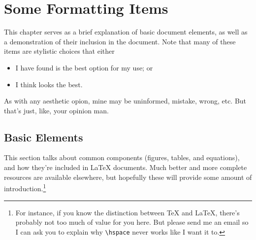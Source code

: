 \chapter{Some Formatting Items}

This chapter serves as a brief explanation of basic document elements, as well as a demonstration of their inclusion in the document.
Note that many of these items are stylistic choices that either
\begin{itemize}
  \item I have found is the best option for my use; or
  \item I think looks the best.
\end{itemize}
As with any aesthetic opion, mine may be uninformed, mistake, wrong, etc. 
But that's just, like, your opinion man.

\section{Basic Elements}
This section talks about common components (figures, tables, and equations), and how they're included in \LaTeX{} documents.
Much better and more complete resources are available elsewhere, but hopefully these will provide some amount of introduction.\footnote{%
For instance, if you know the distinction between \TeX{} and \LaTeX{}, there's probably not too much of value for you here. 
But please send me an email so I can ask you to explain why \texttt{\textbackslash hspace} never works like I want it to.
}


